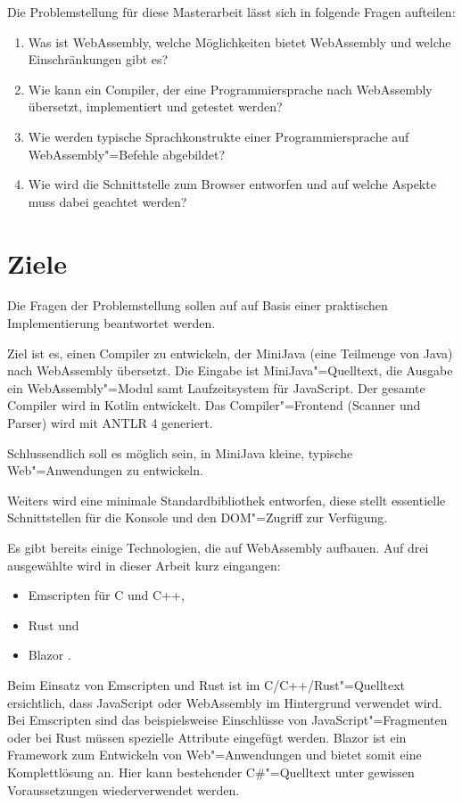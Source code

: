 Die Problemstellung für diese Masterarbeit lässt sich in folgende Fragen aufteilen:

\begin{enumerate}
	\item Was ist WebAssembly, welche Möglichkeiten bietet WebAssembly und welche Einschränkungen gibt es?
	\item Wie kann ein Compiler, der eine Programmiersprache nach WebAssembly übersetzt, implementiert und getestet werden?
	\item Wie werden typische Sprachkonstrukte einer Programmiersprache auf WebAssembly"=Befehle abgebildet?
	\item Wie wird die Schnittstelle zum Browser entworfen und auf welche Aspekte muss dabei geachtet werden?
\end{enumerate}

\section{Ziele}

Die Fragen der Problemstellung sollen auf auf Basis einer praktischen Implementierung beantwortet werden.

Ziel ist es, einen Compiler zu entwickeln, der MiniJava (eine Teilmenge von Java) nach WebAssembly übersetzt. Die Eingabe ist MiniJava"=Quelltext, die Ausgabe ein WebAssembly"=Modul samt Laufzeitsystem für JavaScript. Der gesamte Compiler wird in Kotlin entwickelt. Das Compiler"=Frontend (Scanner und Parser) wird mit ANTLR 4 generiert.

Schlussendlich soll es möglich sein, in MiniJava kleine, typische Web"=Anwendungen zu entwickeln.

Weiters wird eine minimale Standardbibliothek entworfen, diese stellt essentielle Schnittstellen für die Konsole und den DOM"=Zugriff zur Verfügung.

Es gibt bereits einige Technologien, die auf WebAssembly aufbauen. Auf drei ausgewählte wird in dieser Arbeit kurz eingangen:
\begin{itemize}
    \item Emscripten \cite{Emscripten} für C und C++,
    \item Rust \cite{RustWasmWebsite} und
    \item Blazor \cite{Blazor}.
\end{itemize}

Beim Einsatz von Emscripten und Rust ist im C/C++/Rust"=Quelltext ersichtlich, dass JavaScript oder WebAssembly im Hintergrund verwendet wird. Bei Emscripten sind das beispielsweise Einschlüsse von JavaScript"=Fragmenten oder bei Rust müssen spezielle Attribute eingefügt werden. Blazor ist ein Framework zum Entwickeln von Web"=Anwendungen und bietet somit eine Komplettlösung an. Hier kann bestehender C\#{}"=Quelltext unter gewissen Voraussetzungen wiederverwendet werden.

